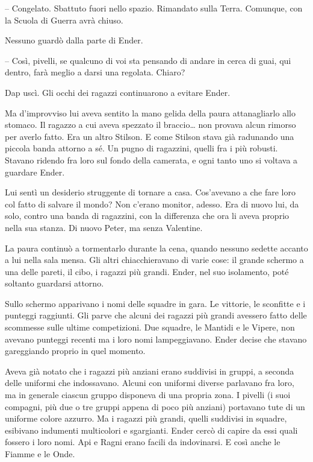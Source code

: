 {-- Congelato. Sbattuto fuori nello spazio. Rimandato sulla Terra.
	Comunque, con la Scuola di Guerra avrà chiuso.}

{Nessuno guardò dalla parte di Ender.}

{-- Così, pivelli, se qualcuno di voi sta pensando di andare in cerca di
	guai, qui dentro, farà meglio a darsi una regolata. Chiaro?}

{Dap uscì. Gli occhi dei ragazzi continuarono a evitare Ender.}

{Ma d'improvviso lui aveva sentito la mano gelida della paura
	attanagliarlo allo stomaco. Il ragazzo a cui aveva spezzato il
	braccio\ldots{} non provava alcun rimorso per averlo fatto. Era un altro
	Stilson. E come Stilson stava già radunando una piccola banda attorno a
	sé. Un pugno di ragazzini, quelli fra i più robusti. Stavano ridendo fra
	loro sul fondo della camerata, e ogni tanto uno si voltava a guardare
	Ender.}

{Lui sentì un desiderio struggente di tornare a casa. Cos'avevano a che
	fare loro col fatto di salvare il mondo? Non c'erano monitor, adesso.
	Era di nuovo lui, da solo, contro una banda di ragazzini, con la
	differenza che ora li aveva proprio nella sua stanza. Di nuovo Peter, ma
	senza Valentine.}

{La paura continuò a tormentarlo durante la cena, quando nessuno sedette
	accanto a lui nella sala mensa. Gli altri chiacchieravano di varie cose:
	il grande schermo a una delle pareti, il cibo, i ragazzi più grandi.
	Ender, nel suo isolamento, poté soltanto guardarsi attorno.}

{Sullo schermo apparivano i nomi delle squadre in gara. Le vittorie, le
	sconfitte e i punteggi raggiunti. Gli parve che alcuni dei ragazzi più
	grandi avessero fatto delle scommesse sulle ultime competizioni. Due
	squadre, le Mantidi e le Vipere, non avevano punteggi recenti ma i loro
	nomi lampeggiavano. Ender decise che stavano gareggiando proprio in quel
	momento.}

{Aveva già notato che i ragazzi più anziani erano suddivisi in gruppi, a
	seconda delle uniformi che indossavano. Alcuni con uniformi diverse
	parlavano fra loro, ma in generale ciascun gruppo disponeva di una
	propria zona. I pivelli (i suoi compagni, più due o tre gruppi appena di
	poco più anziani) portavano tute di un uniforme colore azzurro. Ma i
	ragazzi più grandi, quelli suddivisi in squadre, esibivano indumenti
	multicolori e sgargianti. Ender cercò di capire da essi quali fossero i
	loro nomi. Api e Ragni erano facili da indovinarsi. E così anche le
	Fiamme e le Onde.}

